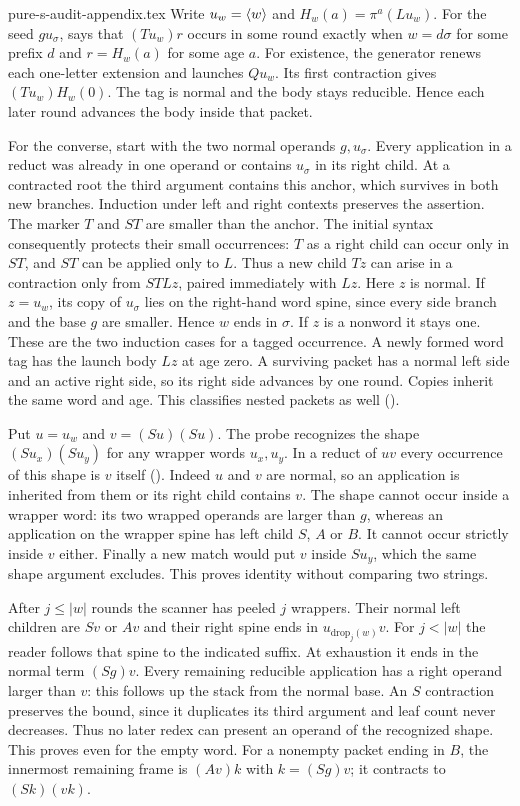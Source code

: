 \begin{filecontents*}[overwrite]{pure-s-audit-appendix.tex}
Write $u_w=\wrap{w}$ and $H_w(a)=\pi^a(Lu_w)$. For the seed $g u_\sigma$,
 says that $(Tu_w)r$ occurs in some round
exactly when $w=d\sigma$ for some prefix $d$ and $r=H_w(a)$ for some
age $a$. For existence, the generator renews each one-letter extension
and launches $Qu_w$. Its first contraction gives $(Tu_w)H_w(0)$.
The tag is normal and the body stays reducible. Hence each later round
advances the body inside that packet.

For the converse, start with the two normal operands $g,u_\sigma$.
Every application in a reduct was already in one operand or contains
$u_\sigma$ in its right child. At a contracted root the third argument
contains this anchor, which survives in both new branches. Induction
under left and right contexts preserves the assertion. The marker $T$
and $ST$ are smaller than the anchor. The initial syntax consequently
protects their small occurrences: $T$ as a right child can occur only in
$ST$, and $ST$ can be applied only to $L$. Thus a new child $Tz$ can arise
in a contraction only from $STLz$, paired immediately with $Lz$.
Here $z$ is normal. If $z=u_w$, its copy of $u_\sigma$ lies on the
right-hand word spine, since every side branch and the base $g$ are
smaller. Hence $w$ ends in $\sigma$. If $z$ is a nonword it stays one.
These are the two induction cases for a tagged occurrence. A newly
formed word tag has the launch body $Lz$ at age zero. A surviving
packet has a normal left side and an active right side, so its right
side advances by one round. Copies inherit the same word and age.
This classifies nested packets as well ().

Put $u=u_w$ and $v=(Su)(Su)$. The probe recognizes the shape
$(Su_x)(Su_y)$ for any wrapper words $u_x,u_y$. In a reduct of $uv$
every occurrence of this shape is $v$ itself
(). Indeed $u$ and $v$ are normal, so an
application is inherited from them or its right child contains $v$.
The shape cannot occur inside a wrapper word: its two wrapped operands
are larger than $g$, whereas an application on the wrapper spine has
left child $S$, $A$ or $B$. It cannot occur strictly inside $v$ either.
Finally a new match would put $v$ inside $Su_y$, which the same shape
argument excludes. This proves identity without comparing two strings.

After $j\le |w|$ rounds the scanner has peeled $j$ wrappers. Their
normal left children are $Sv$ or $Av$ and their right spine ends in
$u_{\mathrm{drop}_j(w)}v$. For $j<|w|$ the reader follows that spine to
the indicated suffix. At exhaustion it ends in the normal term $(Sg)v$.
Every remaining reducible application has a right operand larger than
$v$: this follows up the stack from the normal base. An $S$ contraction
preserves the bound, since it duplicates its third argument and leaf
count never decreases. Thus no later redex can present an operand of the
recognized shape. This proves  even for the
empty word. For a nonempty packet ending in $B$, the innermost remaining
frame is $(Av)k$ with $k=(Sg)v$; it contracts to $(Sk)(vk)$.


\end{filecontents*}
